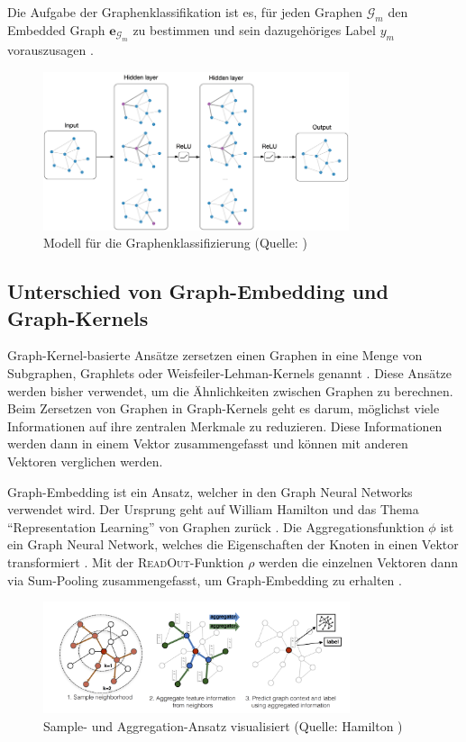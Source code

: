 Die Aufgabe der Graphenklassifikation ist es, für jeden Graphen $ \mathcal{G}_m $ den Embedded Graph $ \mathbf{e}_{\mathcal{G}_m} $ zu bestimmen und sein dazugehöriges Label $ y_m $ vorauszusagen \cite{nguyen_universal_2022}.

\begin{figure}[H]
    \centering
    \includegraphics[width=0.8\textwidth]{images/20_material_methods/model.png}
    \caption{Modell für die Graphenklassifizierung (Quelle: \cite{kipf_semi-supervised_2017})}
    \label{fig:gcn_model}
\end{figure}

\newpage
\subsection{Unterschied von Graph-Embedding und Graph-Kernels}

Graph-Kernel-basierte Ansätze zersetzen einen Graphen in eine Menge von Subgraphen, Graphlets \cite{shervashidze_efficient_2009} oder Weisfeiler-Lehman-Kernels genannt \cite{shervashidze_weisfeiler-lehman_nodate}.
Diese Ansätze werden bisher verwendet, um die Ähnlichkeiten zwischen Graphen zu berechnen.
Beim Zersetzen von Graphen in Graph-Kernels geht es darum, möglichst viele Informationen auf ihre zentralen Merkmale zu reduzieren.
Diese Informationen werden dann in einem Vektor zusammengefasst und können mit anderen Vektoren verglichen werden.

Graph-Embedding ist ein Ansatz, welcher in den Graph Neural Networks verwendet wird. Der Ursprung geht auf William Hamilton und das Thema \enquote{Representation Learning} von Graphen zurück \cite{hamilton_inductive_2018}.
Die Aggregationsfunktion $ \phi $ ist ein Graph Neural Network, welches die Eigenschaften der Knoten in einen Vektor transformiert \cite{xu_how_2019}.
Mit der \textsc{ReadOut}-Funktion $ \rho $ werden die einzelnen Vektoren dann via Sum-Pooling zusammengefasst, um Graph-Embedding zu erhalten \cite{nguyen_universal_2022}.

\begin{figure}[H]
    \centering
    \includegraphics[width=9cm]{images/20_material_methods/graph_representation_learning.png}
    \caption{Sample- und Aggregation-Ansatz visualisiert (Quelle: Hamilton \cite{hamilton_inductive_2018})}
    \label{fig:graph_representation_learning}
\end{figure}
